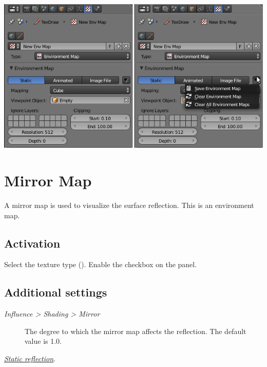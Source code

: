 \documentclass[a4paper,12pt,oneside]{sphinxmanual}
\begin{document}
{\hfill\includegraphics[width=1.000\linewidth]{environment_map_baking_ui.jpg}\hfill}


\section{Mirror Map}
\label{textures:id19}\label{textures:mirror-map}\label{textures:index-11}
A mirror map is used to visualize the surface reflection. This is an environment map.


\subsection{Activation}
\label{textures:id20}
Select the  texture type (). Enable the  checkbox on the  panel.


\subsection{Additional settings}
\label{textures:id21}\begin{description}
\item[{\emph{Influence \textgreater{} Shading \textgreater{} Mirror}}] \leavevmode
The degree to which the mirror map affects the reflection. The default value is 1.0.

\end{description}




{\hyperref[materials:reflection-static]{\emph{Static reflection}}}.



\end{document}
